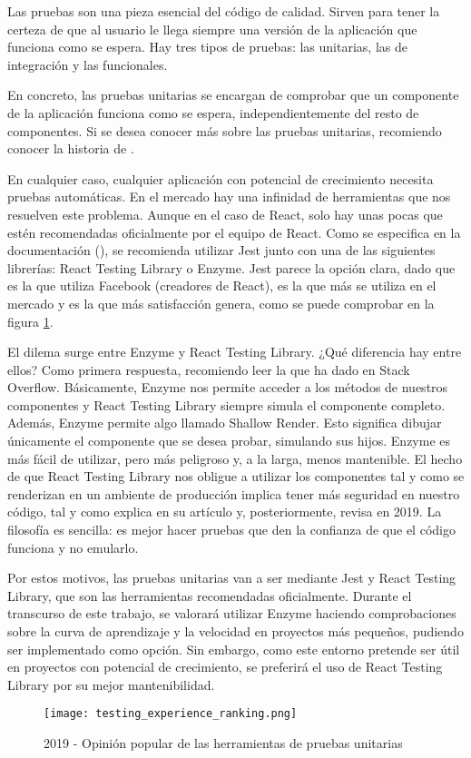 Las pruebas son una pieza esencial del código de calidad. Sirven para tener la certeza de que al usuario le llega siempre una versión de la aplicación que funciona como se espera. Hay tres tipos de pruebas: las unitarias, las de integración y las funcionales.

En concreto, las pruebas unitarias se encargan de comprobar que un componente de la aplicación funciona como se espera, independientemente del resto de componentes. Si se desea conocer más sobre las pruebas unitarias, recomiendo conocer la historia de \citet{WHYUNT}. 

En cualquier caso, cualquier aplicación con potencial de crecimiento necesita pruebas automáticas. En el mercado hay una infinidad de herramientas que nos resuelven este problema. Aunque en el caso de React, solo hay unas pocas que estén recomendadas oficialmente por el equipo de React. Como se especifica en la documentación (\cite{RETEUT}), se recomienda utilizar Jest junto con una de las siguientes librerías: React Testing Library o Enzyme. Jest parece la opción clara, dado que es la que utiliza Facebook (creadores de React), es la que más se utiliza en el mercado y es la que más satisfacción genera, como se puede comprobar en la figura \cref{fig:stjs2019:unit-testing}.

El dilema surge entre Enzyme y React Testing Library. ¿Qué diferencia hay entre ellos? Como primera respuesta, recomiendo leer la que ha dado \citet{EVRUVRL} en Stack Overflow. Básicamente, Enzyme nos permite acceder a los métodos de nuestros componentes y React Testing Library siempre simula el componente completo. Además, Enzyme permite algo llamado Shallow Render. Esto significa dibujar únicamente el componente que se desea probar, simulando sus hijos. Enzyme es más fácil de utilizar, pero más peligroso y, a la larga, menos mantenible. El hecho de que React Testing Library nos obligue a utilizar los componentes tal y como se renderizan en un ambiente de producción implica tener más seguridad en nuestro código, tal y como explica \citet{NVSHRD} en su artículo y, posteriormente, revisa \citet{RVRT19} en 2019. La filosofía es sencilla: es mejor hacer pruebas que den la confianza de que el código funciona y no emularlo.

Por estos motivos, las pruebas unitarias van a ser mediante Jest y React Testing Library, que son las herramientas recomendadas oficialmente. Durante el transcurso de este trabajo, se valorará utilizar Enzyme haciendo comprobaciones sobre la curva de aprendizaje y la velocidad en proyectos más pequeños, pudiendo ser implementado como opción. Sin embargo, como este entorno pretende ser útil en proyectos con potencial de crecimiento, se preferirá el uso de React Testing Library por su mejor mantenibilidad.

\begin{figure}
	\centering
	\texttt{[image: testing\_experience\_ranking.png]}
	\caption{2019 - Opinión popular de las herramientas de pruebas unitarias}
	\label{fig:stjs2019:unit-testing}
\end{figure}